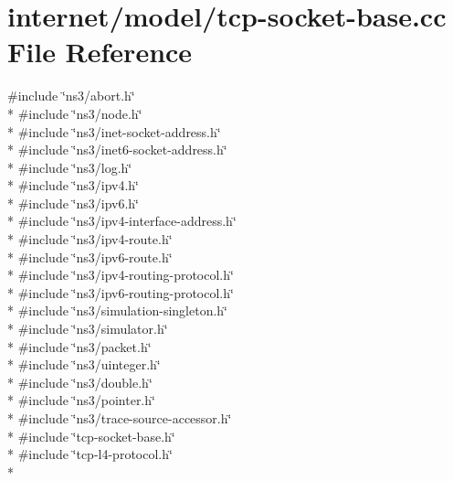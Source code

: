 \hypertarget{tcp-socket-base_8cc}{}\section{internet/model/tcp-\/socket-\/base.cc File Reference}
\label{tcp-socket-base_8cc}
{\ttfamily \#include \char`\"{}ns3/abort.\+h\char`\"{}}\\*
{\ttfamily \#include \char`\"{}ns3/node.\+h\char`\"{}}\\*
{\ttfamily \#include \char`\"{}ns3/inet-\/socket-\/address.\+h\char`\"{}}\\*
{\ttfamily \#include \char`\"{}ns3/inet6-\/socket-\/address.\+h\char`\"{}}\\*
{\ttfamily \#include \char`\"{}ns3/log.\+h\char`\"{}}\\*
{\ttfamily \#include \char`\"{}ns3/ipv4.\+h\char`\"{}}\\*
{\ttfamily \#include \char`\"{}ns3/ipv6.\+h\char`\"{}}\\*
{\ttfamily \#include \char`\"{}ns3/ipv4-\/interface-\/address.\+h\char`\"{}}\\*
{\ttfamily \#include \char`\"{}ns3/ipv4-\/route.\+h\char`\"{}}\\*
{\ttfamily \#include \char`\"{}ns3/ipv6-\/route.\+h\char`\"{}}\\*
{\ttfamily \#include \char`\"{}ns3/ipv4-\/routing-\/protocol.\+h\char`\"{}}\\*
{\ttfamily \#include \char`\"{}ns3/ipv6-\/routing-\/protocol.\+h\char`\"{}}\\*
{\ttfamily \#include \char`\"{}ns3/simulation-\/singleton.\+h\char`\"{}}\\*
{\ttfamily \#include \char`\"{}ns3/simulator.\+h\char`\"{}}\\*
{\ttfamily \#include \char`\"{}ns3/packet.\+h\char`\"{}}\\*
{\ttfamily \#include \char`\"{}ns3/uinteger.\+h\char`\"{}}\\*
{\ttfamily \#include \char`\"{}ns3/double.\+h\char`\"{}}\\*
{\ttfamily \#include \char`\"{}ns3/pointer.\+h\char`\"{}}\\*
{\ttfamily \#include \char`\"{}ns3/trace-\/source-\/accessor.\+h\char`\"{}}\\*
{\ttfamily \#include \char`\"{}tcp-\/socket-\/base.\+h\char`\"{}}\\*
{\ttfamily \#include \char`\"{}tcp-\/l4-\/protocol.\+h\char`\"{}}\\*
